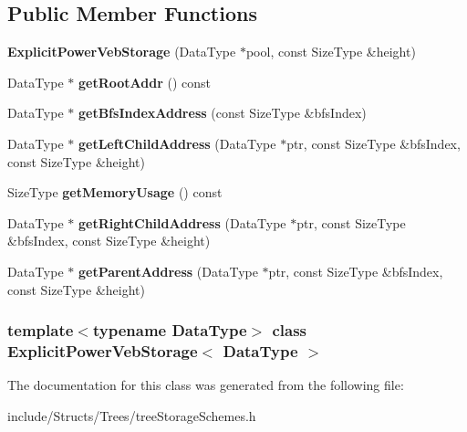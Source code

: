 \subsection*{Public Member Functions}
\begin{DoxyCompactItemize}
\item 
\hypertarget{class_explicit_power_veb_storage_a6020bc7a8ce0204a3c403c4ecb9195f5}{
{\bfseries ExplicitPowerVebStorage} (DataType $\ast$pool, const SizeType \&height)}
\label{class_explicit_power_veb_storage_a6020bc7a8ce0204a3c403c4ecb9195f5}

\item 
\hypertarget{class_explicit_power_veb_storage_ae24e887845ccd337bcb07479154d062b}{
DataType $\ast$ {\bfseries getRootAddr} () const }
\label{class_explicit_power_veb_storage_ae24e887845ccd337bcb07479154d062b}

\item 
\hypertarget{class_explicit_power_veb_storage_ab4e67b779120cd5c3b81b488cfe19433}{
DataType $\ast$ {\bfseries getBfsIndexAddress} (const SizeType \&bfsIndex)}
\label{class_explicit_power_veb_storage_ab4e67b779120cd5c3b81b488cfe19433}

\item 
\hypertarget{class_explicit_power_veb_storage_a3c62b98213a576cc05b228d23e0e28a2}{
DataType $\ast$ {\bfseries getLeftChildAddress} (DataType $\ast$ptr, const SizeType \&bfsIndex, const SizeType \&height)}
\label{class_explicit_power_veb_storage_a3c62b98213a576cc05b228d23e0e28a2}

\item 
\hypertarget{class_explicit_power_veb_storage_aa9d5f81ebbd9cbf8c651e587a474dcda}{
SizeType {\bfseries getMemoryUsage} () const }
\label{class_explicit_power_veb_storage_aa9d5f81ebbd9cbf8c651e587a474dcda}

\item 
\hypertarget{class_explicit_power_veb_storage_a9aee949c54a881f11597c999165eb3c2}{
DataType $\ast$ {\bfseries getRightChildAddress} (DataType $\ast$ptr, const SizeType \&bfsIndex, const SizeType \&height)}
\label{class_explicit_power_veb_storage_a9aee949c54a881f11597c999165eb3c2}

\item 
\hypertarget{class_explicit_power_veb_storage_a52952542ef9b88a8823e5d230c0e60d4}{
DataType $\ast$ {\bfseries getParentAddress} (DataType $\ast$ptr, const SizeType \&bfsIndex, const SizeType \&height)}
\label{class_explicit_power_veb_storage_a52952542ef9b88a8823e5d230c0e60d4}

\end{DoxyCompactItemize}
\subsubsection*{template$<$typename DataType$>$ class ExplicitPowerVebStorage$<$ DataType $>$}



The documentation for this class was generated from the following file:\begin{DoxyCompactItemize}
\item 
include/Structs/Trees/treeStorageSchemes.h\end{DoxyCompactItemize}
